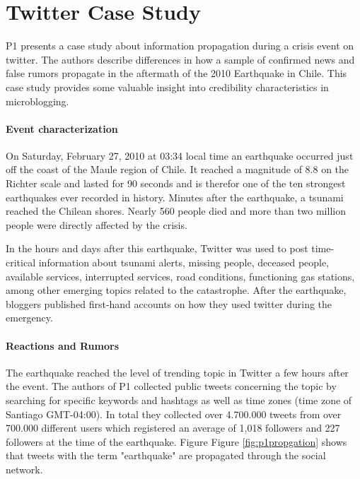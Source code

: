 \documentclass{proseminar}
\begin{document}


\section{Twitter Case Study}
P1 presents a case study about information propagation during a crisis event on twitter. The authors describe differences in how a sample of confirmed news and false rumors propagate in the aftermath of the 2010 Earthquake in Chile. This case study provides some valuable insight into credibility characteristics in microblogging.


\paragraph{Event characterization}
On Saturday, February 27, 2010 at 03:34 local time an earthquake occurred just off the coast of the Maule region of Chile. It reached a magnitude of 8.8 on the Richter scale and lasted for 90 seconds and is therefor one of the ten strongest earthquakes ever recorded in history. Minutes after the earthquake, a
tsunami reached the Chilean shores. Nearly 560 people died and more than two million people were directly affected by the crisis.

In the hours and days after this earthquake, Twitter was used to post time-critical information about tsunami alerts, missing people, deceased people, available services, interrupted services, road conditions, functioning gas stations, among other emerging topics related to the catastrophe. After the earthquake, bloggers published first-hand accounts on how they used twitter during the emergency\cite{p1previouswork}.


\paragraph{Reactions and Rumors}
The earthquake reached the level of trending topic in Twitter a few hours after the event. The authors of P1 collected public tweets concerning the topic by searching for specific keywords and hashtags as well as time zones (time zone of Santiago GMT-04:00). In total they collected over 4.700.000 tweets from over 700.000 different users  which registered an average of 1,018 followers and 227 followers at the time of the earthquake. 
Figure Figure \ref{fig:p1propgation} shows that tweets with the term "earthquake" are propagated through the social network.
\end{document}

